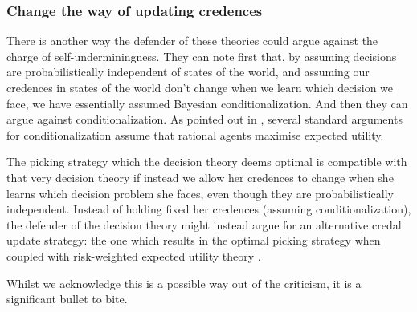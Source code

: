\documentclass[a4paper,final]{article}
\newcommand{\todoinfo}[2][]{\todo[inline,{#1}]{#2}}
\renewcommand{\color}[1]{}
\newenvironment{colored}[1]{\leavevmode\color{#1}}{}
\newenvironment{CCM rewritten}
{\begingroup\color{blue}} %
{\endgroup}              %
\begin{document}




	\subsubsection{Change the way of updating credences}

There is another way the defender of these theories could argue against the charge of self-underminingness. They can note first that, by assuming decisions are probabilistically independent of states of the world, and assuming our credences in states of the world don't change when we learn which decision we face, we have essentially assumed Bayesian conditionalization. And then they can argue against conditionalization. As pointed out in \citet[16]{campbellmoore2020arae}, several standard arguments for conditionalization assume that rational agents maximise expected utility.

The picking strategy which the decision theory deems optimal is compatible with that very decision theory if instead we allow her credences to change when she learns which decision problem she faces, even though they are probabilistically independent. Instead of holding fixed her credences (assuming conditionalization), the defender of the decision theory might instead argue for an alternative credal update strategy: the one which results in the optimal picking strategy when coupled with risk-weighted expected utility theory \citep[see also][]{campbellmoore2022aurs,brown1976ceu}.

Whilst we acknowledge this is a possible way out of the criticism, it is a significant bullet to bite. 





\end{document}
